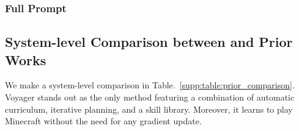 \subsubsection{Full Prompt}
\renewcommand\lstlistingname{Prompt}
\setcounter{lstlisting}{5}


\subsection{System-level Comparison between \voyager and Prior Works}
We make a system-level comparison in Table.~\ref{supp:table:prior_comparison}. Voyager stands out as the only method featuring a combination of automatic curriculum, iterative planning, and a skill library. Moreover, it learns to play Minecraft without the need for any gradient update.
